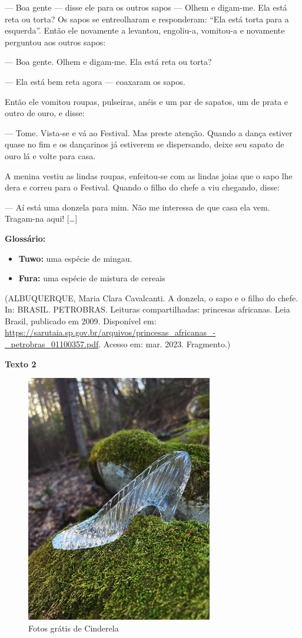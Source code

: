 --- Boa gente --- disse ele para os outros sapos --- Olhem e digam-me. Ela
está reta ou torta? Os sapos se entreolharam e responderam: ``Ela está
torta para a esquerda''. Então ele novamente a levantou, engoliu-a,
vomitou-a e novamente perguntou aos outros sapos:

--- Boa gente. Olhem e digam-me. Ela está reta ou torta?

--- Ela está bem reta agora --- coaxaram os sapos.

Então ele vomitou roupas, pulseiras, anéis e um par de sapatos, um de
prata e outro de ouro, e disse:

--- Tome. Vista-se e vá ao Festival. Mas preste atenção. Quando a dança
estiver quase no fim e os dançarinos já estiverem se dispersando, deixe
seu sapato de ouro lá e volte para casa.

A menina vestiu as lindas roupas, enfeitou-se com as lindas joias que o
sapo lhe dera e correu para o Festival. Quando o filho do chefe a viu
chegando, disse:

--- Aí está uma donzela para mim. Não me interessa de que casa ela vem.
Tragam-na aqui! {[}\ldots{}{]}

\textbf{Glossário:}
\begin{itemize}
\item\textbf{Tuwo:} uma espécie de mingau.
\item\textbf{Fura:} uma espécie de mistura de cereais
\end{itemize}

(ALBUQUERQUE, Maria Clara Cavalcanti. A donzela, o sapo e o filho do
chefe. In: BRASIL. PETROBRAS. Leituras compartilhadas: princesas
africanas. Leia Brasil, publicado em 2009. Disponível em: 
\url{https://sarutaia.sp.gov.br/arquivos/princesas_africanas_-_petrobras_01100357.pdf}.
Acesso em: mar. 2023. Fragmento.)

\textbf{Texto 2}

\begin{figure}
\centering
\includegraphics[width=3.20455in,height=4.27009in]{./imgSAEB_6_POR/media/image9.jpeg}
\caption{Fotos grátis de Cinderela}
\end{figure}

